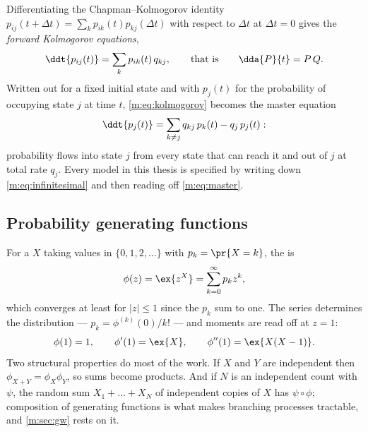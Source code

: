 Differentiating the Chapman--Kolmogorov identity
$p_{ij}(t+\Delta t) = \sum_k p_{ik}(t)p_{kj}(\Delta t)$ with respect to $\Delta t$
at $\Delta t=0$ gives the \emph{forward Kolmogorov equations},
\begin{equation}
\label{m:eq:kolmogorov}
\ddt{p_{ij}(t)} = \sum_{k} p_{ik}(t)\,q_{kj},
\qquad\text{that is}\qquad
\dda{P}{t} = P\,Q .
\end{equation}
Written out for a fixed initial state and with $p_j(t)$ for the probability of
occupying state $j$ at time $t$, \cref{m:eq:kolmogorov} becomes the master equation
\begin{equation}
\label{m:eq:master}
\ddt{p_j(t)} = \sum_{k\neq j}q_{kj}\,p_k(t) - q_j\,p_j(t):
\end{equation}
probability flows into state $j$ from every state that can reach it and out of $j$
at total rate $q_j$. Every model in this thesis is specified by writing down
\cref{m:eq:infinitesimal} and then reading off \cref{m:eq:master}.

\subsection{Probability generating functions}
\label{m:sec:pgf}

For a \rv{} $X$ taking values in $\{0,1,2,\dots\}$ with $p_k = \pr{X=k}$, the
\pgf{} is
\begin{equation}
\label{m:eq:pgfdef}
\phi(z) = \ex{z^X} = \sum_{k=0}^{\infty}p_k z^k ,
\end{equation}
which converges at least for $|z|\le1$ since the $p_k$ sum to one. The series
determines the distribution --- $p_k = \phi^{(k)}(0)/k!$ --- and moments are read
off at $z=1$:
\begin{equation}
\label{m:eq:pgfmoments}
\phi(1) = 1,
\qquad
\phi'(1) = \ex{X},
\qquad
\phi''(1) = \ex{X(X-1)} .
\end{equation}
Two structural properties do most of the work. If $X$ and $Y$ are independent then
$\phi_{X+Y} = \phi_X\phi_Y$, so sums become products. And if $N$ is an independent
count with \pgf{} $\psi$, the random sum $X_1+\dots+X_N$ of independent copies of
$X$ has \pgf{} $\psi\circ\phi$; composition of generating functions is what makes
branching processes tractable, and \cref{m:sec:gw} rests on it.

